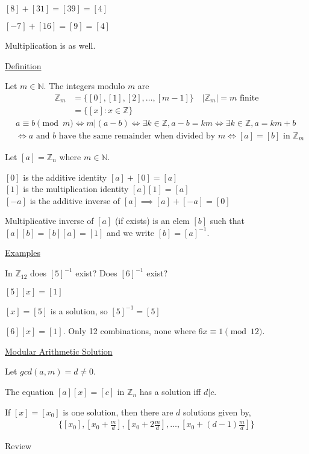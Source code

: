 \documentclass{article}
\begin{document}
$[8] + [31] = [39] = [4]$

$[-7]+[16] = [9] = [4]$

Multiplication is as well. 

\underline{Definition}

Let $m \in \mathbb{N}$. The integers modulo $m$ are
\begin{align*}
    \mathbb{Z}_m &= \{[0],[1],[2],\ldots,[m-1]\} \quad |\mathbb{Z}_m| = m \text{ finite}\\
    &= \{[x]:x \in \mathbb{Z}\}
\end{align*}
\begin{align*}
    &a \equiv b \pmod{m} \iff m \vert (a-b) \iff \exists k \in \mathbb{Z}, a-b = km \iff \exists k \in \mathbb{Z}, a = km + b\\
    &\iff a \text{ and } b \text{ have the same remainder when divided by } m \iff [a] = [b] \text{ in } \mathbb{Z}_m
\end{align*}

Let $[a] = \mathbb{Z}_n$ where $m \in \mathbb{N}$. 

$[0]$ is the additive identity $[a] + [0] = [a]$\\
$[1]$ is the multiplication identity $[a][1] = [a]$\\
$[-a]$ is the additive inverse of $[a] \implies [a]+[-a]=[0]$

Multiplicative inverse of $[a]$ (if exists) is an elem $[b]$ such that $[a][b] = [b][a] = [1]$ and we write $[b]=[a]^{-1}$.

\underline{Examples}

In $\mathbb{Z}_{12}$ does $[5]^{-1}$ exist? Does $[6]^{-1}$ exist?

$[5][x]=[1]$

 $[x] = [5]$ is a solution, so $[5]^{-1} = [5]$

 $[6][x] = [1]$. Only 12 combinations, none where $6x \equiv 1 \pmod{12}$. 

 \underline{Modular Arithmetic Solution}

 Let $gcd(a,m) = d \ne 0$. 

 The equation $[a][x]=[c]$ in $\mathbb{Z}_n$ has a solution iff $d \vert c$. 

 If $[x] = [x_0]$ is one solution, then there are $d$ solutions given by, 
 \begin{align*}
     \{[x_0],[x_0 + \frac{m}{d}], [x_0 + 2\frac{m}{d}],\ldots,[x_0 + (d-1)\frac{m}{d}]\}
 \end{align*}

Review 
\end{document}
